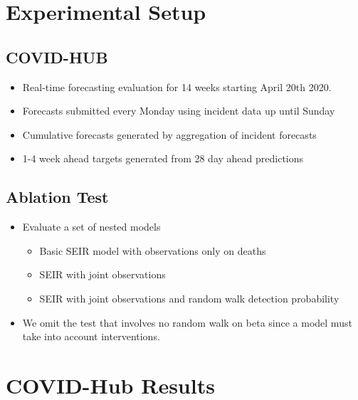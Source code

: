 \documentclass[11pt]{amsart}
\begin{document}
   
   
 \section{Experimental Setup}
 
 
 \subsection{COVID-HUB}
 \begin{itemize}
 \item Real-time forecasting evaluation for 14 weeks starting April 20th 2020. 
 \item Forecasts submitted every Monday using incident data up until Sunday
 \item Cumulative forecasts generated by aggregation of incident forecasts
 \item 1-4 week ahead targets generated from 28 day ahead predictions 
 \end{itemize}
 
 \subsection{Ablation Test}
 \begin{itemize}
 \item Evaluate a set of nested models
 \begin{itemize}
 \item Basic SEIR model with observations only on deaths
 \item SEIR with joint observations
 \item SEIR with joint observations and random walk detection probability
 \end{itemize}
 \item We omit the test that involves no random walk on beta since a model must take into account interventions.

 
 \end{itemize}


\section{COVID-Hub Results}
\end{document}
